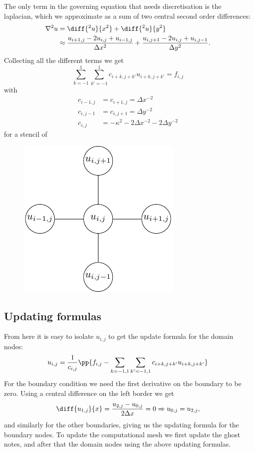 \documentclass[sigconf]{acmart}
\begin{document}
The only term in the governing equation that needs discretisation is the laplacian, which we approximate as a sum of two central second order differences:
\begin{align}
	\nabla^2 u &= \diff{^2 u}{x^2} + \diff{^2 u}{y^2} \\
	&\approx \frac{u_{i+1, j} - 2 u_{i,j} + u_{i-1,j}}{\Delta x^2} + \frac{u_{i, j+1} - 2 u_{i,j} + u_{i,j-1}}{\Delta y^2}.
\end{align}
Collecting all the different terms we get
\begin{equation}\label{key}
	\sum_{k = -1}^{1} \sum_{k' = -1}^{1} c_{i+k, j+k'} u_{i+k, j+k'} = f_{i,j}
\end{equation}
with
\begin{align}\label{key}
	c_{i-1,j} &= c_{i+1, j} = \Delta x^{-2} \\
	c_{i,j-1} &= c_{i, j+1} = \Delta y^{-2} \\
	c_{i,j} &= -\kappa^2 - 2\Delta x^{-2} - 2\Delta y^{-2}
\end{align}
for a stencil of
\begin{figure}[H]
	\centering
	\includegraphics{stencil.pdf}
\end{figure}

\subsection{Updating formulas}
From here it is easy to isolate $ u_{i,j} $ to get the update formula for the domain nodes:
\begin{equation}\label{key}
	u_{i,j}  = \frac{1}{c_{i,j}} \pp{f_{i,j} - \sum_{k = -1, 1}\sum_{k' = -1, 1} c_{i+k, j+k'} u_{i+k, j+k'}}
\end{equation}
For the boundary condition we need the first derivative on the boundary to be zero. Using a central difference on the left border we get
\begin{equation}\label{key}
\diff{u_{1,j}}{x} =\frac{u_{2,j} - u_{0,j}}{2\Delta x} = 0 \Rightarrow u_{0,j} = u_{2,j},
\end{equation}
and similarly for the other boundaries, giving us the updating formula for the boundary nodes. To update the computational mesh we first update the ghost notes, and after that the domain nodes using the above updating formulas.
\end{document}
